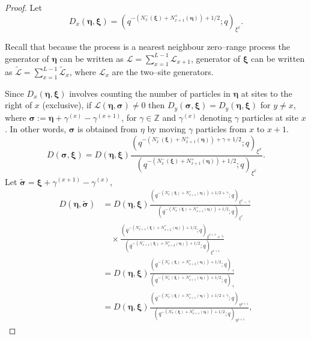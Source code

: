 \documentclass{ximera}
\begin{document}
\begin{proof}



Let 
\begin{equation}
    D_x(\boldsymbol\eta,\boldsymbol\xi)=\left(q^{-\left(N_{x}^-(\boldsymbol\xi)+N_{x+1}^+(\boldsymbol\eta)\right)+1/2};q\right)_{\xi^x}.  
\end{equation}

Recall that  because the process is a nearest neighbour zero--range process the generator of $\boldsymbol\eta$ can be written as $\mathcal{L}=\sum_{x=1}^{L-1}\mathcal{L}_{x+1}$, generator of $\boldsymbol\xi$ can be written as $\tilde{\mathcal{L}}=\sum_{x=1}^{L-1}\tilde{\mathcal{L}}_x$, where $\mathcal{L}_x$ are the two--site generators. 

Since $D_x(\boldsymbol\eta,\boldsymbol\xi)$ involves counting the number of particles in $\boldsymbol\eta$ at sites to the right of $x$ (exclusive), if $\mathcal{L}(\boldsymbol\eta,\boldsymbol\sigma)\neq 0$ then $D_y(\boldsymbol\sigma,\boldsymbol\xi)=D_y(\boldsymbol\eta,\boldsymbol\xi)$ for $y\neq x$, where $\boldsymbol\sigma:=\boldsymbol\eta+\gamma^{(x)}-\gamma^{(x+1)}$, for  $\gamma\in \mathbb{Z}$ and $\gamma^{(x)}$ denoting $\gamma$ particles at site $x$. In other words,  $\boldsymbol\sigma$ is obtained from $\eta$ by moving $\gamma$ particles from $x$ to $x+1$.
\begin{equation*}
    D(\boldsymbol\sigma,\boldsymbol\xi)=D(\boldsymbol\eta,\boldsymbol\xi)\frac{\left(q^{-\left(N_{x}^-(\boldsymbol\xi)+N_{x+1}^+(\boldsymbol\eta)\right)+\gamma+1/2};q\right)_{\xi^x}}{\left(q^{-\left(N_{x}^-(\boldsymbol\xi)+N_{x+1}^+(\boldsymbol\eta)\right)+1/2};q\right)_{\xi^x}}.
\end{equation*}
Let $\tilde{\boldsymbol\sigma}=\boldsymbol\xi+\gamma^{(x+1)}-\gamma^{(x)}$,
\begin{align*}
D(\boldsymbol\eta,\tilde{\boldsymbol\sigma})& =D(\boldsymbol\eta,\boldsymbol\xi)\frac{\left(q^{-\left(N_{x}^-(\boldsymbol\xi)+N_{x+1}^+(\boldsymbol\eta)\right)+1/2+\gamma};q\right)_{\xi^x-\gamma}}{\left(q^{-\left(N_{x}^-(\boldsymbol\xi)+N_{x+1}^+(\boldsymbol\eta)\right)+1/2};q\right)_{\xi^x}}\\   
&\quad\times\frac{\left(q^{-\left(N_{x+1}^-(\boldsymbol\xi)+N_{x+2}^+(\boldsymbol\eta)\right)+1/2};q\right)_{\xi^{x+1}+\gamma}}{\left(q^{-\left(N_{x+1}^-(\boldsymbol\xi)+N_{x+2}^+(\boldsymbol\eta)\right)+1/2};q\right)_{\xi^{x+1}}}
\\&=D(\boldsymbol\eta,\boldsymbol\xi)\frac{\left(q^{-\left(N_{x}^-(\boldsymbol\xi)+N_{x+2}^+(\boldsymbol\eta)\right)+1/2};q\right)_\gamma}{\left(q^{-\left(N_{x}^-(\boldsymbol\xi)+N_{x+1}^+(\boldsymbol\eta)\right)+1/2};q\right)_\gamma}\\    &=D(\boldsymbol\eta,\boldsymbol\xi)\frac{\left(q^{-\left(N_{x}^-(\boldsymbol\xi)+N_{x+1}^+(\boldsymbol\eta)\right)+1/2+\gamma};q\right)_{\eta^{x+1}}}{\left(q^{-\left(N_{x}^-(\boldsymbol\xi)+N_{x+1}^+(\boldsymbol\eta)\right)+1/2};q\right)_{\eta^{x+1}}},
\end{align*}



\end{proof}
\end{document}
